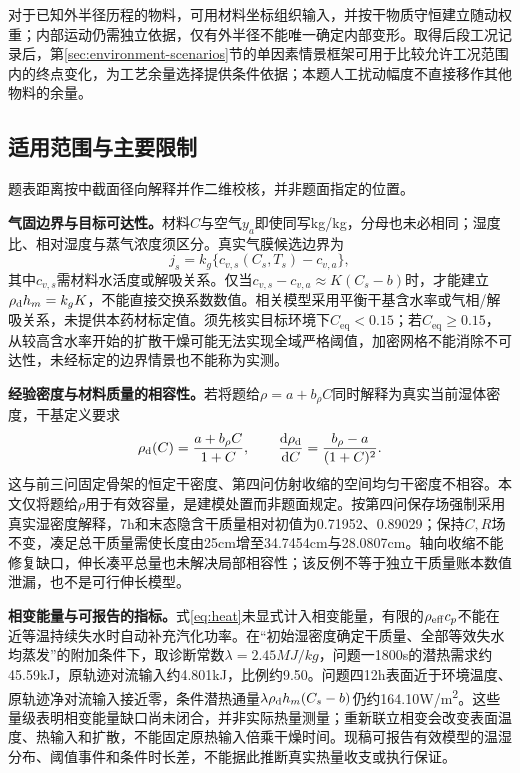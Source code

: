 对于已知外半径历程的物料，可用材料坐标组织输入，并按干物质守恒建立随动权重；内部运动仍需独立依据，仅有外半径不能唯一确定内部变形。取得后段工况记录后，第\ref{sec:environment-scenarios}节的单因素情景框架可用于比较允许工况范围内的终点变化，为工艺余量选择提供条件依据；本题人工扰动幅度不直接移作其他物料的余量。

\begingroup
\setlength{\parskip}{0pt}
\subsection{适用范围与主要限制}
\label{sec:limitations}
题表距离按中截面径向解释并作二维校核，并非题面指定的位置。

\textbf{气固边界与目标可达性。}材料$C$与空气$y_a$即使同写\unit{kg/kg}，分母也未必相同；湿度比、相对湿度与蒸气浓度须区分\cite{ashrae}。真实气膜候选边界为
\begin{equation}
j_s=k_g\{c_{v,s}(C_s,T_s)-c_{v,a}\},
\label{eq:physical-interface}
\end{equation}
其中$c_{v,s}$需材料水活度或解吸关系。仅当$c_{v,s}-c_{v,a}\approx K(C_s-b)$时，才能建立$\rho_{\mathrm d} h_m=k_gK$，不能直接交换系数数值。相关模型采用平衡干基含水率或气相/解吸关系\cite{dasilva2014,adrover2020}，未提供本药材标定值。须先核实目标环境下$C_{\mathrm{eq}}<0.15$；若$C_{\mathrm{eq}}\ge0.15$，从较高含水率开始的扩散干燥可能无法实现全域严格阈值，加密网格不能消除不可达性，未经标定的边界情景也不能称为实测。

\textbf{经验密度与材料质量的相容性。}若将题给$\rho=a+b_\rho C$同时解释为真实当前湿体密度，干基定义要求
\begin{equation}
\rho_{\mathrm d}(C)=\frac{a+b_\rho C}{1+C},\qquad
\frac{\mathop{}\!\mathrm d\rho_{\mathrm d}}{\mathop{}\!\mathrm d C}=\frac{b_\rho-a}{(1+C)^2}.
\end{equation}
这与前三问固定骨架的恒定干密度、第四问仿射收缩的空间均匀干密度不相容。本文仅将题给$\rho$用于有效容量，是建模处置而非题面规定。按第四问保存场强制采用真实湿密度解释，7\unit{h}和末态隐含干质量相对初值为0.71952、0.89029；保持$C,R$场不变，凑足总干质量需使长度由25\unit{cm}增至34.7454\unit{cm}与28.0807\unit{cm}。轴向收缩不能修复缺口，伸长凑平总量也未解决局部相容性；该反例不等于独立干质量账本数值泄漏，也不是可行伸长模型。

\textbf{相变能量与可报告的指标。}式\eqref{eq:heat}未显式计入相变能量，有限的$\rho_{\mathrm{eff}} c_p$不能在近等温持续失水时自动补充汽化功率。在“初始湿密度确定干质量、全部等效失水均蒸发”的附加条件下，取诊断常数$\lambda=2.45\unit{MJ/kg}$\cite{fao}，问题一1800\unit{s}的潜热需求约45.59\unit{kJ}，原轨迹对流输入约4.801\unit{kJ}，比例约9.50。问题四12\unit{h}表面近于环境温度、原轨迹净对流输入接近零，条件潜热通量$\lambda\rho_{\mathrm d} h_m(C_s-b)$仍约164.10\unit{W/m^2}。这些量级表明相变能量缺口尚未闭合，并非实际热量测量；重新联立相变会改变表面温度、热输入和扩散，不能固定原热输入倍乘干燥时间。现稿可报告有效模型的温湿分布、阈值事件和条件时长差，不能据此推断真实热量收支或执行保证。

